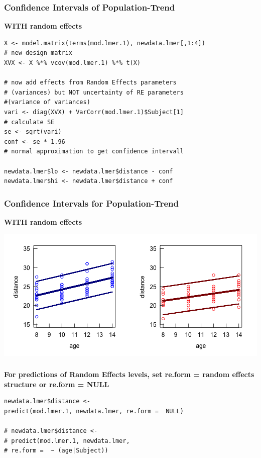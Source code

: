 \documentclass{beamer}
\begin{document}
\begin{frame}[fragile]
    \frametitle{Confidence Intervals of Population-Trend}
    \textbf{WITH random effects}

    \small\begin{Verbatim}[frame=single]
X <- model.matrix(terms(mod.lmer.1), newdata.lmer[,1:4]) 
# new design matrix
XVX <- X %*% vcov(mod.lmer.1) %*% t(X) 

# now add effects from Random Effects parameters 
# (variances) but NOT uncertainty of RE parameters 
#(variance of variances)
vari <- diag(XVX) + VarCorr(mod.lmer.1)$Subject[1]  
# calculate SE
se <- sqrt(vari)           
conf <- se * 1.96 
# normal approximation to get confidence intervall

newdata.lmer$lo <- newdata.lmer$distance - conf
newdata.lmer$hi <- newdata.lmer$distance + conf
    \end{Verbatim}
\end{frame}

\begin{frame}[fragile]
    \frametitle{Confidence Intervals for Population-Trend}
    \textbf{WITH random effects}

    \begin{center}
        \includegraphics[width=\textwidth]{lectures/day_6_praxis_and_fitting_of_mems/figures/unnamed-chunk-30-1.png}
    \end{center}
\end{frame}

\begin{frame}[fragile]
    \frametitle{}
    \textbf{For predictions of Random Effects levels, set re.form = random effects structure or re.form = NULL}
    \vspace{0.5cm}
    
    \small\begin{Verbatim}[frame=single]
newdata.lmer$distance <- 
predict(mod.lmer.1, newdata.lmer, re.form =  NULL)

# newdata.lmer$distance <- 
# predict(mod.lmer.1, newdata.lmer, 
# re.form =  ~ (age|Subject))
    \end{Verbatim}
\end{frame}
\end{document}
